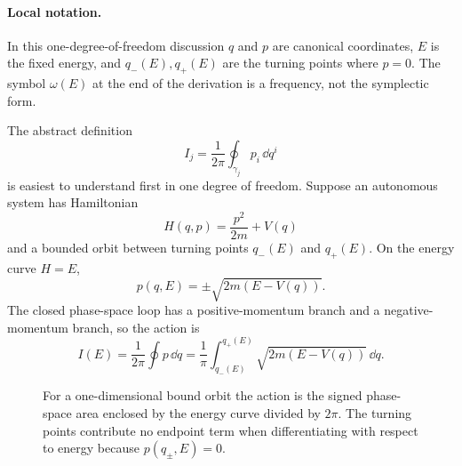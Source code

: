 \paragraph{Local notation.}
In this one-degree-of-freedom discussion \(q\) and \(p\) are canonical
coordinates, \(E\) is the fixed energy, and \(q_-(E),q_+(E)\) are the turning
points where \(p=0\).  The symbol \(\omega(E)\) at the end of the derivation is
a frequency, not the symplectic form.

The abstract definition
\[
  I_j=\frac{1}{2\pi}\oint_{\gamma_j}p_i\,\dd q^i
\]
is easiest to understand first in one degree of freedom. Suppose an autonomous
system has Hamiltonian
\[
  H(q,p)=\frac{p^2}{2m}+V(q)
\]
and a bounded orbit between turning points \(q_-(E)\) and \(q_+(E)\). On the
energy curve \(H=E\),
\[
  p(q,E)=\pm\sqrt{2m(E-V(q))}.
\]
The closed phase-space loop has a positive-momentum branch and a
negative-momentum branch, so the action is
\[
  \boxed{
  I(E)=\frac{1}{2\pi}\oint p\,\dd q
  =
  \frac1{\pi}\int_{q_-(E)}^{q_+(E)}
  \sqrt{2m(E-V(q))}\,\dd q.
  }
\]

\begin{figure}[htbp]
\centering
{}
\caption{For a one-dimensional bound orbit the action is the signed
phase-space area enclosed by the energy curve divided by \(2\pi\). The turning
points contribute no endpoint term when differentiating with respect to
energy because \(p(q_\pm,E)=0\).}
\label{fig:action-loop}
\end{figure}

